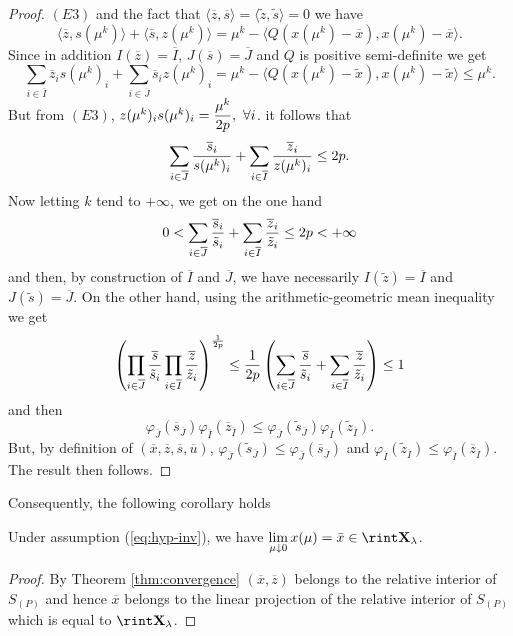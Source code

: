 \begin{proof}
$(E3)$ and the fact that $\langle\overline{z},\overline{s}\rangle=\langle\tilde{z},\tilde{s}\rangle=0$ we have 
$$\langle\overline{z},s(\mu^k)\rangle+\langle\overline{s},z(\mu^k)\rangle=\mu^k-\langle Q(x(\mu^k)-\overline{x}),x(\mu^k)-\overline{x}\rangle.$$ 
Since in addition $I(\overline{z})=\overline{I}$, $J(\overline{s})=\overline{J}$ and $Q$ is positive semi-definite we get
$$\sum\limits_{i\in \overline{I}}\overline{z}_is(\mu^k)_i+\sum\limits_{i\in \overline{J}}\overline{s}_iz(\mu^k)_i=\mu^k-\langle Q(x(\mu^k)-\tilde{x}),x(\mu^k)-\tilde{x}\rangle\leq\mu^k.$$
But from $(E3)$, $z(\mu^k)_is(\mu^k)_i=\displaystyle{\mu^k\over 2p},\ \forall i$. it follows that
$$\displaystyle\sum\limits_{i\in \overline{J}}{\overline{s}_i\over s(\mu^k)_i}+\sum\limits_{i\in \overline{I}}{\overline{z}_i\over z(\mu^k)_i}\leq 2p.$$
Now letting $k$ tend to $+\infty$, we get on the one hand
$$0<\displaystyle\sum\limits_{i\in \overline{J}}{\overline{s}_i\over \tilde{s}_i}+\sum\limits_{i\in \overline{I}}{\overline{z}_i\over \tilde{z}_i}\leq 2p<+\infty$$
and then, by construction of $\overline{I}$ and $\overline{J}$, we have necessarily $I(\tilde{z})=\overline{I}$ and $J(\tilde{s})=\overline{J}$. On the other hand,
using the arithmetic-geometric mean inequality we get
$$\left(\prod\limits_{i\in \overline{J}}\displaystyle{\overline{s}\over \tilde{s}_i}\prod\limits_{i\in \overline{I}}\displaystyle{\overline{z}\over \tilde{z}_i}\right)^{1\over 2p}\leq{1\over 2p}\left(\displaystyle\sum\limits_{i\in \overline{J}}{\overline{s}\over \tilde{s}_i}+\sum\limits_{i\in \overline{I}}{\overline{z}\over \tilde{z}_i}\right)\leq 1$$
and then 
$$\varphi_{\overline{J}}( \overline{s}_{\overline{J}})\varphi_{\overline{I}}( \overline{z}_{\overline{I}})\leq\varphi_{\overline{J}}( \tilde{s}_{\overline{J}})\varphi_{\overline{I}}( \tilde{z}_{\overline{I}}).$$
But, by definition of $(\overline{x},\overline{z},\overline{s},\overline{u})$, $\varphi_{\overline{J}}( \tilde{s}_{\overline{J}})\leq \varphi_{\overline{J}}( \overline{s}_{\overline{J}})$ and $\varphi_{\overline{I}}( \tilde{z}_{\overline{I}})\leq \varphi_{\overline{I}}( \overline{z}_{\overline{I}})$.  The result then follows. 
\end{proof}

Consequently, the following corollary holds
\begin{corollary}
  Under assumption (\ref{eq:hyp-inv}), we have $\lim\limits_{\mu \downarrow 0} x(\mu) = \bar x \in \rint \Xl$.
\end{corollary}

\begin{proof}
By  Theorem \ref{thm:convergence} $(\overline{x},\overline{z})$ belongs to  the relative interior of $S_{(P)}$ and hence $\overline{x}$ belongs to the linear projection of the relative interior of $S_{(P)}$ which is equal to $\rint \Xl$.
\end{proof}